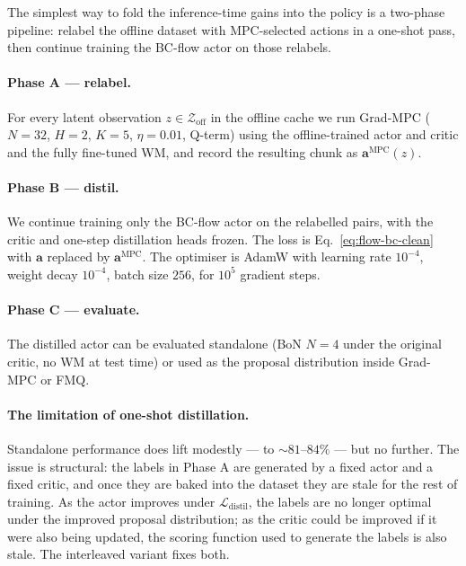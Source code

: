 The simplest way to fold the inference-time gains into the policy is a
two-phase pipeline: relabel the offline dataset with MPC-selected
actions in a one-shot pass, then continue training the BC-flow actor on
those relabels.

\paragraph{Phase A --- relabel.}
For every latent observation $z \in \mathcal{Z}_{\text{off}}$ in the
offline cache we run Grad-MPC ($N = 32$, $H = 2$, $K = 5$,
$\eta = 0.01$, Q-term) using the offline-trained actor and critic and
the fully fine-tuned WM, and record the resulting chunk as
$\mathbf{a}^{\text{MPC}}(z)$.

\paragraph{Phase B --- distil.}
We continue training only the BC-flow actor on the relabelled pairs,
with the critic and one-step distillation heads frozen. The loss is
Eq.~\eqref{eq:flow-bc-clean} with $\mathbf{a}$ replaced by
$\mathbf{a}^{\text{MPC}}$. The optimiser is AdamW with learning rate
$10^{-4}$, weight decay $10^{-4}$, batch size $256$, for $10^5$
gradient steps.

\paragraph{Phase C --- evaluate.}
The distilled actor can be evaluated standalone (BoN $N = 4$ under the
original critic, no WM at test time) or used as the proposal
distribution inside Grad-MPC or FMQ.

\paragraph{The limitation of one-shot distillation.}
Standalone performance does lift modestly --- to $\sim 81$--$84\%$ ---
but no further. The issue is structural: the labels in Phase A are
generated by a fixed actor and a fixed critic, and once they are baked
into the dataset they are stale for the rest of training. As the actor
improves under $\mathcal{L}_{\text{distil}}$, the labels are no longer
optimal under the improved proposal distribution; as the critic could
be improved if it were also being updated, the scoring function used
to generate the labels is also stale. The interleaved variant fixes
both.

